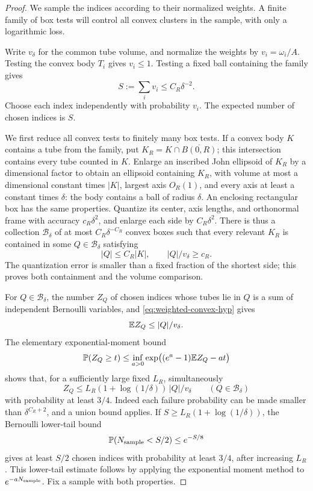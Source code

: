 \begin{proof}
We sample the indices according to their normalized weights. A finite
family of box tests will control all convex clusters in the sample,
with only a logarithmic loss.

Write $v_\delta$ for the common tube volume, and normalize the
weights by $v_i=\omega_i/A$. Testing the convex body $T_i$ gives
$v_i\le1$. Testing a fixed ball containing the family gives
\[
 S:=\sum_i v_i\le C_R\delta^{-2}.
\]
Choose each index independently with probability $v_i$. The expected
number of chosen indices is $S$.

We first reduce all convex tests to finitely many box tests. If a
convex body $K$ contains a tube from the family, put
$K_R=K\cap\overline{B(0,R)}$; this intersection contains every tube
counted in $K$. Enlarge an inscribed John ellipsoid of $K_R$ by a
dimensional factor to obtain an ellipsoid containing $K_R$, with volume
at most a dimensional constant times $|K|$, largest axis $O_R(1)$,
and every axis at least a constant times $\delta$: the body contains
a ball of radius $\delta$. An enclosing rectangular box has the same
properties. Quantize its center, axis lengths, and orthonormal frame
with accuracy $c_R\delta^2$, and enlarge each side by $C_R\delta^2$.
There is thus a collection $\mathcal B_\delta$ of at most
$C_R\delta^{-C_R}$ convex boxes such that every relevant $K_R$ is
contained in some $Q\in\mathcal B_\delta$ satisfying
\[
 |Q|\le C_R|K|,\qquad |Q|/v_\delta\ge c_R.
\]
The quantization error is smaller than a fixed fraction of the
shortest side; this proves both containment and the volume comparison.

For $Q\in\mathcal B_\delta$, the number $Z_Q$ of chosen indices
whose tubes lie in $Q$ is a sum of independent Bernoulli variables,
and \eqref{eq:weighted-convex-hyp} gives
\[
 \mathbb E Z_Q\le |Q|/v_\delta.
\]
The elementary exponential-moment bound
\[
 \mathbb P(Z_Q\ge t)
 \le \inf_{a>0}\exp\bigl((e^a-1)\mathbb E Z_Q-at\bigr)
\]
shows that, for a sufficiently large fixed $L_R$, simultaneously
\begin{equation}\label{eq:sample-box-bound}
 Z_Q\le L_R(1+\log(1/\delta))\,|Q|/v_\delta
 \qquad(Q\in\mathcal B_\delta)
\end{equation}
with probability at least $3/4$. Indeed each failure probability
can be made smaller than $\delta^{C_R+2}$, and a union bound applies.
If $S\ge L_R(1+\log(1/\delta))$, the Bernoulli lower-tail bound
\[
 \mathbb P(N_{\rm sample}<S/2)\le e^{-S/8}
\]
gives at least $S/2$ chosen indices with probability at least $3/4$,
after increasing $L_R$. This lower-tail estimate follows by applying
the exponential moment method to $e^{-aN_{\rm sample}}$.
Fix a sample with both properties.


\end{proof}
